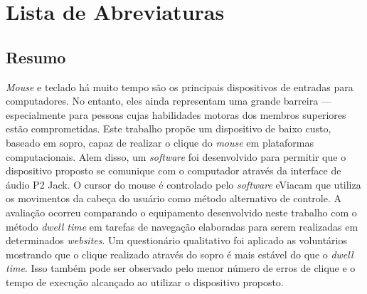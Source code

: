 \documentclass{ufpatcc}
\begin{document}

\listoffigures 
{} 
\clearpage

\listoftables 
{} 
\clearpage

\chapter*{Lista de Abreviaturas} \label{sec:siglas}
 \label{sec:siglas} 
\clearpage




\begin{ufpaResumo}
\chapter*{Resumo}
\textit{Mouse} e teclado há muito tempo são os principais dispositivos de
entradas para computadores. No entanto, eles ainda representam uma grande
barreira --- especialmente para pessoas cujas habilidades motoras dos membros
superiores estão comprometidas. Este trabalho propõe um dispositivo de baixo
custo, baseado em sopro, capaz de realizar o clique do \textit{mouse} em
plataformas computacionais. Alem disso, um \textit{software} foi desenvolvido
para permitir que o dispositivo proposto se comunique com o computador através
da interface de áudio P2 Jack. O cursor do mouse é controlado pelo
\textit{software} eViacam que utiliza os movimentos da cabeça do usuário como
método alternativo de controle. A avaliação ocorreu comparando o equipamento
desenvolvido neste trabalho com o método \textit{dwell time} em tarefas de
navegação elaboradas para serem realizadas em determinados \textit{websites}. Um
questionário qualitativo foi aplicado as voluntários mostrando que o clique
realizado através do sopro é mais estável do que o \textit{dwell time}. Isso
também pode ser observado pelo menor número de erros de
clique e o tempo de execução alcançado ao utilizar o dispositivo proposto.
\end{ufpaResumo}
\end{document}
